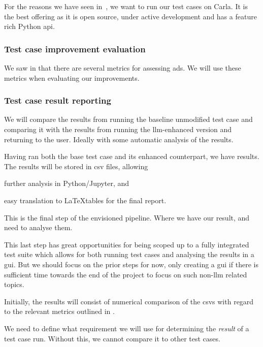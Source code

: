 For the reasons we have seen in~, we want to run our
test cases on Carla. It is the best offering as it is open source, under active
development and has a feature rich Python \acrshort{api}.

\subsubsection{Test case improvement evaluation}\label{sec:testCaseEval}

We saw in  that there are several metrics for assessing
\acrshort{ads}. We will use these metrics when evaluating our improvements.

\subsubsection{Test case result reporting}

We will compare the results from running
the baseline unmodified test case and comparing it with the results from
running the \acrshort{llm}-enhanced version and returning to the user. Ideally with
some automatic analysis of the results.

Having ran both the base test case and its enhanced counterpart, we have
results. The results will be stored in \acrfull{csv} files, allowing \begin{inparaenum}
    \item further analysis in Python/Jupyter,
    and
    \item easy translation to \LaTeX tables for the final report.
\end{inparaenum}

This is the final step of the envisioned pipeline. Where we have our result, and
need to analyse them.

This last step has great opportunities for being scoped up to a fully integrated
test suite which allows for both running test cases and analysing the results in
a \acrfull{gui}. But we should focus on the prior steps for now, only creating a
\acrshort{gui} if there is sufficient time towards the end of the project to
focus on such non-\acrshort{llm} related topics.

Initially, the results will consist of numerical comparison of the
\acrshort{csv}s with regard to the relevant metrics outlined in
.

We need to define what requirement we will use for determining the \textit{result} of a test case
run. Without this, we cannot compare it to other test cases.

